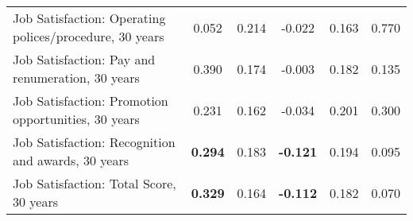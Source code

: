 \begin{tabular}{l c c c c c}
Job Satisfaction: Operating polices/procedure, 30 years & 0.052 & 0.214 &  -0.022 & 0.163 & 0.770 \\
Job Satisfaction: Pay and renumeration, 30 years & 0.390 & 0.174 &  -0.003 & 0.182 & 0.135 \\
Job Satisfaction: Promotion opportunities, 30 years & 0.231 & 0.162 &  -0.034 & 0.201 & 0.300 \\
Job Satisfaction: Recognition and awards, 30 years & \textbf{0.294} & 0.183 &  \textbf{-0.121} & 0.194 & 0.095 \\
Job Satisfaction: Total Score, 30 years & \textbf{0.329} & 0.164 &  \textbf{-0.112} & 0.182 & 0.070 \\
\bottomrule
\end{tabular}
